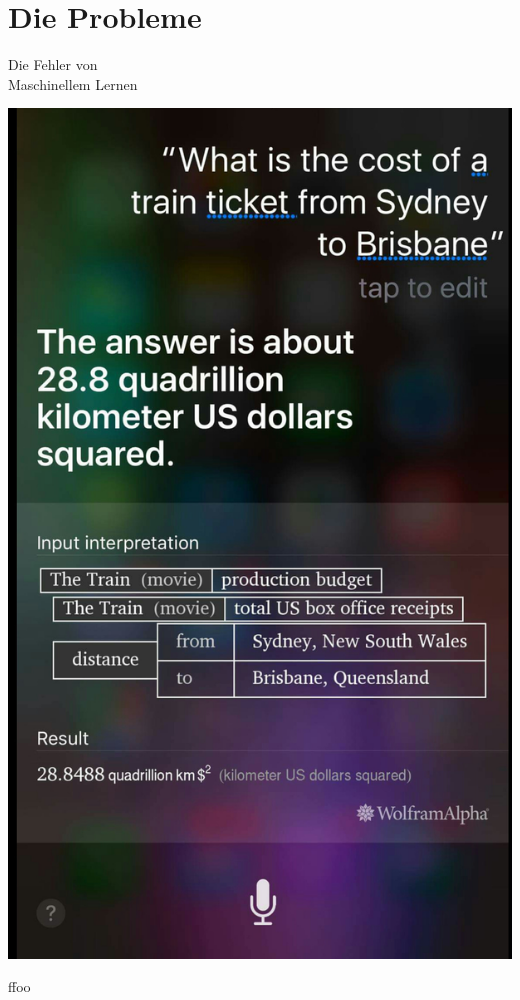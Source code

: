 \documentclass[aspectratio=43,x11names]{beamer}
\begin{document}

\section{Die Probleme}

\begin{frame}
\begin{center}
\Large
Die Fehler von\\Maschinellem Lernen
\end{center}
\end{frame}

\begin{frame}

\begin{multicols}{2}

\includegraphics[scale=0.1]{images/sirifail.jpg} 

\columnbreak

ffoo
\end{multicols}
\end{frame}
\end{document}
